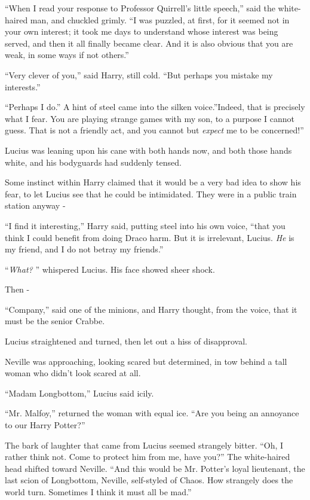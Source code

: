 ``When I read your response to Professor Quirrell's little speech,''
said the white-haired man, and chuckled grimly. ``I was puzzled, at
first, for it seemed not in your own interest; it took me days to
understand whose interest was being served, and then it all finally
became clear. And it is also obvious that you are weak, in some ways if
not others.''

``Very clever of you,'' said Harry, still cold. ``But perhaps you
mistake my interests.''

``Perhaps I do.'' A hint of steel came into the silken voice.''Indeed,
that is precisely what I fear. You are playing strange games with my
son, to a purpose I cannot guess. That is not a friendly act, and you
cannot but \emph{expect} me to be concerned!''

Lucius was leaning upon his cane with both hands now, and both those
hands white, and his bodyguards had suddenly tensed.

Some instinct within Harry claimed that it would be a very bad idea to
show his fear, to let Lucius see that he could be intimidated. They were
in a public train station anyway -

``I find it interesting,'' Harry said, putting steel into his own voice,
``that you think I could benefit from doing Draco harm. But it is
irrelevant, Lucius. \emph{He} is my friend, and I do not betray my
friends.''

``\emph{What?} '' whispered Lucius. His face showed sheer shock.

Then -

``Company,'' said one of the minions, and Harry thought, from the voice,
that it must be the senior Crabbe.

Lucius straightened and turned, then let out a hiss of disapproval.

Neville was approaching, looking scared but determined, in tow behind a
tall woman who didn't look scared at all.

``Madam Longbottom,'' Lucius said icily.

``Mr. Malfoy,'' returned the woman with equal ice. ``Are you being an
annoyance to our Harry Potter?''

The bark of laughter that came from Lucius seemed strangely bitter.
``Oh, I rather think not. Come to protect him from me, have you?'' The
white-haired head shifted toward Neville. ``And this would be Mr.
Potter's loyal lieutenant, the last scion of Longbottom, Neville,
self-styled of Chaos. How strangely does the world turn. Sometimes I
think it must all be mad.''

